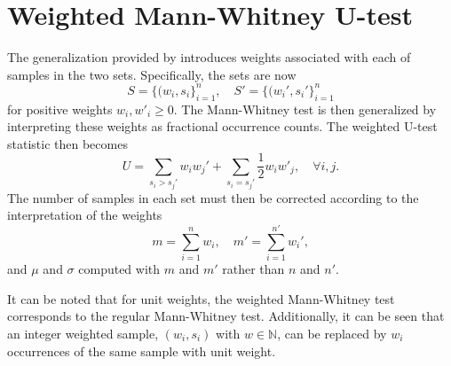\section{Weighted Mann-Whitney U-test}
The generalization provided by \cite{Schaul2011a} introduces weights associated with each of samples in the two sets. Specifically, the sets are now
\begin{equation}
    S = \{(w_i,s_i\}_{i=1}^{n}, \quad
    S' = \{(w_i',s_i'\}_{i=1}^{n}
\end{equation}
for positive weights $w_i, w'_i\geq0$. The Mann-Whitney test is then generalized by interpreting these weights as fractional occurrence counts. 
The weighted U-test statistic then becomes
\begin{equation}
    U = \sum_{s_i > s_j'} w_i w_j' + \sum_{s_i=s_j'} \frac{1}{2} w_i w'_j, \quad \forall i,j.
\end{equation}
The number of samples in each set must then be corrected according to the interpretation of the weights
\begin{equation}
    m = \sum_{i=1}^n w_i, \quad
    m' = \sum_{i=1}^{n'} w_i',
\end{equation}
and $\mu$ and $\sigma$ computed with $m$ and $m'$ rather than $n$ and $n'$.

It can be noted that for unit weights, the weighted Mann-Whitney test corresponds to the regular Mann-Whitney test. Additionally, it can be seen that an integer weighted sample, $(w_i,s_i)$ with $w\in\mathbb{N}$, can be replaced by $w_i$ occurrences of the same sample with unit weight.